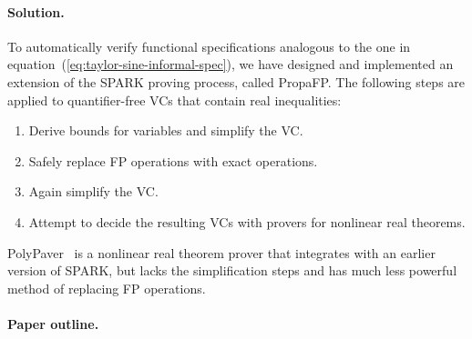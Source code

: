 \documentclass[runningheads]{llncs}
\begin{document}

\paragraph{Solution.}
To automatically verify functional specifications analogous to the one in equation~(\ref{eq:taylor-sine-informal-spec}), we have designed and implemented an extension of the SPARK proving process, called PropaFP.  The following steps are applied to quantifier-free VCs that contain real inequalities:
\begin{enumerate}
  \item Derive bounds for variables and simplify the VC.
  \item Safely replace FP operations with exact operations.
  \item Again simplify the VC.
  \item Attempt to decide the resulting VCs with provers for nonlinear real theorems.
\end{enumerate}
PolyPaver~\cite{duracz2014-polypaver} is a nonlinear real theorem prover that integrates with an earlier version of SPARK, but lacks the simplification steps and has much less powerful method of replacing FP operations.


\paragraph*{Paper outline.}
\end{document}
